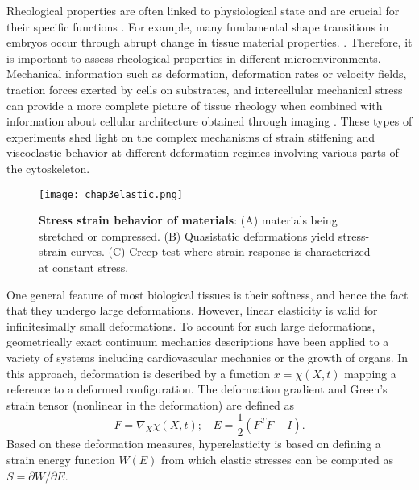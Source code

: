 Rheological properties are often linked to physiological state and are crucial for their specific functions \cite{park2015, vedula2012}. For example, many fundamental shape transitions in embryos occur through abrupt change in tissue material properties. \cite{hannezo2022}. Therefore, it is important to assess rheological properties in different microenvironments. Mechanical information such as deformation, deformation rates or velocity fields, traction forces exerted by cells on substrates, and intercellular mechanical stress can provide a more complete picture of tissue rheology when combined with information about cellular architecture obtained through imaging \cite{roca-cusachs2017}. These types of experiments shed light on the complex mechanisms of strain stiffening and viscoelastic behavior at different deformation regimes involving various parts of the cytoskeleton.

\begin{figure}
	\centering
	\texttt{[image: chap3elastic.png]}
	\caption{\label{fig_3_8} \textbf{Stress strain behavior of materials}: (A) materials being stretched or compressed. (B) Quasistatic deformations yield stress-strain curves. (C) Creep test where strain response is characterized at constant stress.
	}
\end{figure}

One general feature of most biological tissues is their softness, and hence the fact that they undergo large deformations. However, linear elasticity is valid for infinitesimally small deformations. To account for such large deformations, geometrically exact continuum mechanics descriptions have been applied to a variety of systems including cardiovascular mechanics or the growth of organs. In this approach, deformation is described by a function  \(x = \chi (X, t)\) mapping a reference to a deformed configuration. The deformation gradient and Green's strain tensor (nonlinear in the deformation) are defined as
$$ F = \nabla_X \chi(X, t);\ \ \ \ E = \frac{1}{2}(F^T F - I). $$ 
Based on these deformation measures, hyperelasticity is based on defining a strain energy function $W(E)$ from which elastic stresses can be computed as $S = {\partial W}/{\partial E}$. 



